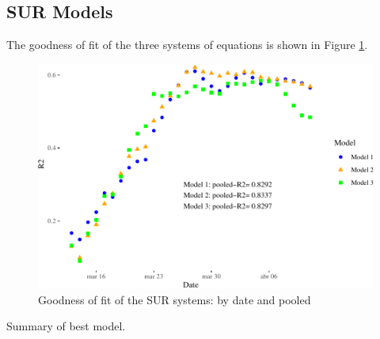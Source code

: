 \documentclass[]{elsarticle} %
\makeatletter
\def\maxwidth{\ifdim\Gin@nat@width>\linewidth\linewidth
\else\Gin@nat@width\fi}
\let\Oldincludegraphics\includegraphics
\renewcommand{\includegraphics}[1]{\Oldincludegraphics[width=\maxwidth]{#1}}
\makeatother
\begin{document}
\hypertarget{sur-models}{%
\subsection{SUR Models}\label{sur-models}}

The goodness of fit of the three systems of equations is shown in Figure
\ref{fig:goodness-of-fit}.

\begin{figure}
\centering
\includegraphics{Environmental-Correlates-of-COVID19-Spain_files/figure-latex/goodness-of-fit-1.pdf}
\caption{\label{fig:goodness-of-fit} Goodness of fit of the SUR systems:
by date and pooled}
\end{figure}

Summary of best model.
\end{document}

